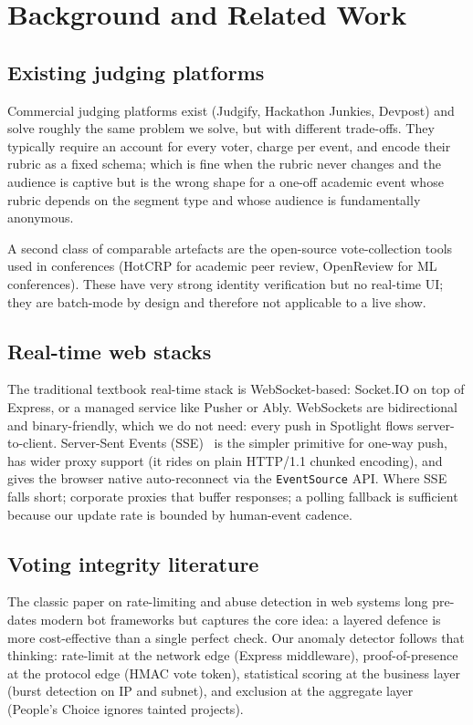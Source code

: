 \section{Background and Related Work}
\label{sec:background}

\subsection{Existing judging platforms}

Commercial judging platforms exist (Judgify, Hackathon Junkies, Devpost) and
solve roughly the same problem we solve, but with different trade-offs. They
typically require an account for every voter, charge per event, and encode
their rubric as a fixed schema; which is fine when the rubric never
changes and the audience is captive but is the wrong shape for a one-off
academic event whose rubric depends on the segment type and whose audience
is fundamentally anonymous.

A second class of comparable artefacts are the open-source vote-collection
tools used in conferences (HotCRP for academic peer review, OpenReview for
ML conferences). These have very strong identity verification but no
real-time UI; they are batch-mode by design and therefore not applicable
to a live show.

\subsection{Real-time web stacks}

The traditional textbook real-time stack is WebSocket-based: Socket.IO on
top of Express, or a managed service like Pusher or Ably. WebSockets are
bidirectional and binary-friendly, which we do not need: every push in
Spotlight flows server-to-client. Server-Sent Events
(SSE)~\cite{w3c-sse} is the simpler primitive for one-way push, has wider
proxy support (it rides on plain HTTP/1.1 chunked encoding), and gives the
browser native auto-reconnect via the \texttt{EventSource} API. Where
SSE falls short; corporate proxies that buffer responses; a polling
fallback is sufficient because our update rate is bounded by human-event
cadence.

\subsection{Voting integrity literature}

The classic paper on rate-limiting and abuse detection in web systems
\cite{leiba-spam} long pre-dates modern bot frameworks but captures the
core idea: a layered defence is more cost-effective than a single perfect
check. Our anomaly detector follows that thinking: rate-limit at the
network edge (Express middleware), proof-of-presence at the protocol
edge (HMAC vote token), statistical scoring at the business layer
(burst detection on IP and subnet), and exclusion at the aggregate layer
(People's Choice ignores tainted projects).

